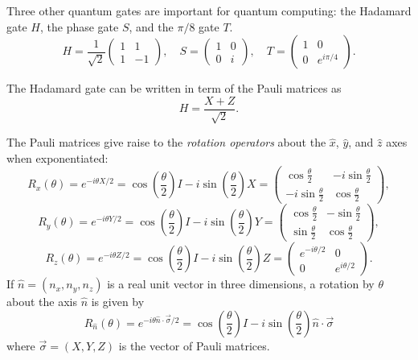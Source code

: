 Three other quantum gates are important for quantum computing: the Hadamard gate $H$, the phase gate $S$, and the $\pi/8$ gate $T$.
\[
    H = \frac{1}{\sqrt{2}}\begin{pmatrix}
        1 & 1 \\
        1 & -1
    \end{pmatrix},\quad
    S = \begin{pmatrix}
        1 & 0 \\
        0 & i
    \end{pmatrix},\quad
    T = \begin{pmatrix}
        1 & 0 \\
        0 & e^{i\pi/4}
    \end{pmatrix}.
\]

The Hadamard gate can be written in term of the Pauli matrices as
\[
    H = \frac{X + Z}{\sqrt{2}}.
\]

The Pauli matrices give raise to the \emph{rotation operators} about the $\hat{x}$, $\hat{y}$, and $\hat{z}$ axes when exponentiated:
\[
    R_x(\theta) 
    = e^{-i\theta X/2}
    = \cos\left(\frac{\theta}{2}\right)I - i\sin\left(\frac{\theta}{2}\right)X
    = \begin{pmatrix}
        \cos\frac{\theta}{2} & -i\sin\frac{\theta}{2} \\
        -i\sin\frac{\theta}{2} & \cos\frac{\theta}{2}
    \end{pmatrix},
\]
\[
    R_y(\theta)
    = e^{-i\theta Y/2}
    = \cos\left(\frac{\theta}{2}\right)I - i\sin\left(\frac{\theta}{2}\right)Y
    = \begin{pmatrix}
        \cos\frac{\theta}{2} & -\sin\frac{\theta}{2} \\
        \sin\frac{\theta}{2} & \cos\frac{\theta}{2}
    \end{pmatrix},
\]
\[
    R_z(\theta)
    = e^{-i\theta Z/2}
    = \cos\left(\frac{\theta}{2}\right)I - i\sin\left(\frac{\theta}{2}\right)Z
    = \begin{pmatrix}
        e^{-i\theta/2} & 0 \\
        0 & e^{i\theta/2}
    \end{pmatrix}.
\]
If $\hat{n} = (n_x, n_y, n_z)$ is a real unit vector in three dimensions,
a rotation by $\theta$ about the axis $\hat{n}$ is given by
\[
    R_{\hat{n}}(\theta) = e^{-i\theta \hat{n} \cdot \vec{\sigma}/2}
    = \cos\left(\frac{\theta}{2}\right)I - i\sin\left(\frac{\theta}{2}\right)\hat{n} \cdot \vec{\sigma}
\]
where $\vec{\sigma} = (X, Y, Z)$ is the vector of Pauli matrices.

